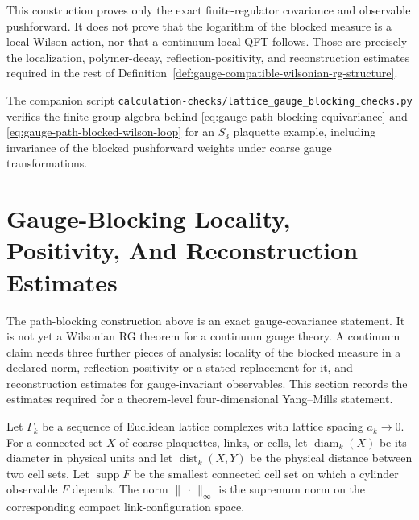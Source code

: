 \begin{construction}
This construction proves only the exact finite-regulator covariance and
observable pushforward.  It does not prove that the logarithm of the blocked
measure is a local Wilson action, nor that a continuum local QFT follows.
Those are precisely the localization, polymer-decay, reflection-positivity,
and reconstruction estimates required in the rest of
Definition~\ref{def:gauge-compatible-wilsonian-rg-structure}.
\end{construction}

The companion script
\texttt{calculation-checks/lattice\_gauge\_blocking\_checks.py} verifies the
finite group algebra behind
\eqref{eq:gauge-path-blocking-equivariance} and
\eqref{eq:gauge-path-blocked-wilson-loop} for an \(S_3\) plaquette example,
including invariance of the blocked pushforward weights under coarse gauge
transformations.

\section{Gauge-Blocking Locality, Positivity, And Reconstruction Estimates}
\label{sec:gauge-blocking-locality-positivity-reconstruction}

The path-blocking construction above is an exact gauge-covariance statement.
It is not yet a Wilsonian RG theorem for a continuum gauge theory.  A
continuum claim needs three further pieces of analysis: locality of the
blocked measure in a declared norm, reflection positivity or a stated
replacement for it, and reconstruction estimates for gauge-invariant
observables.  This section records the estimates required for a theorem-level
four-dimensional Yang--Mills statement.

Let \(\Gamma_k\) be a sequence of Euclidean lattice complexes with lattice
spacing \(a_k\to0\).  For a connected set \(X\) of coarse plaquettes, links,
or cells, let \(\operatorname{diam}_k(X)\) be its diameter in physical units
and let \(\operatorname{dist}_k(X,Y)\) be the physical distance between two
cell sets.  Let \(\operatorname{supp}F\) be the smallest connected cell set on
which a cylinder observable \(F\) depends.  The norm
\(\|\,\cdot\,\|_\infty\) is the supremum norm on the corresponding compact
link-configuration space.

